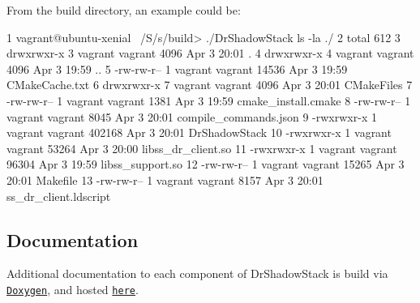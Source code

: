 From the build directory, an example could be\+: 
\begin{DoxyCode}
1 vagrant@ubuntu-xenial ~/S/s/build> ./DrShadowStack ls -la ./
2 total 612
3 drwxrwxr-x 3 vagrant vagrant   4096 Apr  3 20:01 .
4 drwxrwxr-x 4 vagrant vagrant   4096 Apr  3 19:59 ..
5 -rw-rw-r-- 1 vagrant vagrant  14536 Apr  3 19:59 CMakeCache.txt
6 drwxrwxr-x 7 vagrant vagrant   4096 Apr  3 20:01 CMakeFiles
7 -rw-rw-r-- 1 vagrant vagrant   1381 Apr  3 19:59 cmake\_install.cmake
8 -rw-rw-r-- 1 vagrant vagrant   8045 Apr  3 20:01 compile\_commands.json
9 -rwxrwxr-x 1 vagrant vagrant 402168 Apr  3 20:01 DrShadowStack
10 -rwxrwxr-x 1 vagrant vagrant  53264 Apr  3 20:00 libss\_dr\_client.so
11 -rwxrwxr-x 1 vagrant vagrant  96304 Apr  3 19:59 libss\_support.so
12 -rw-rw-r-- 1 vagrant vagrant  15265 Apr  3 20:01 Makefile
13 -rw-rw-r-- 1 vagrant vagrant   8157 Apr  3 20:01 ss\_dr\_client.ldscript
\end{DoxyCode}


\subsection*{Documentation}

Additional documentation to each component of Dr\+Shadow\+Stack is build via \href{http://www.stack.nl/~dimitri/doxygen/}{\tt Doxygen}, and hosted \href{https://zwimer.com/DrShadowStack}{\tt here}. 
